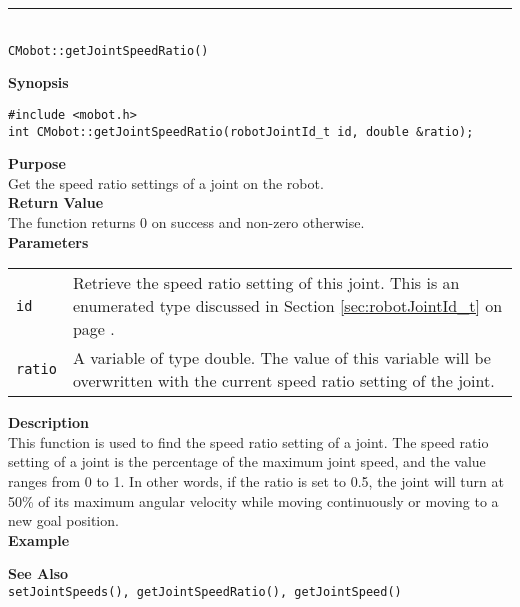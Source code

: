 \noindent
\vspace{5pt}
\rule{4.5in}{0.015in}\\
\noindent
{\LARGE \texttt{CMobot::getJointSpeedRatio()}}\\
{}

\noindent
{\bf Synopsis}\\
\begin{verbatim}
#include <mobot.h>
int CMobot::getJointSpeedRatio(robotJointId_t id, double &ratio);
\end{verbatim}

\noindent
{\bf Purpose}\\
Get the speed ratio settings of a joint on the robot.\\

\noindent
{\bf Return Value}\\
The function returns 0 on success and non-zero otherwise.\\

\noindent
{\bf Parameters}
\vspace{-0.1in}
\begin{description}
\item               
\begin{tabular}{p{10 mm}p{145 mm}}
\texttt{id} & Retrieve the speed ratio setting of this joint. This is an 
enumerated type discussed in Section \ref{sec:robotJointId_t} on page
\pageref{sec:robotJointId_t}.\\
\texttt{ratio} & A variable of type double. The value of this variable will
be overwritten with the current speed ratio setting of the joint.
\end{tabular}
\end{description}

\noindent
{\bf Description}\\
This function is used to find the speed ratio setting of a joint. The speed
ratio setting of a joint is the percentage of the maximum joint speed, and the
value ranges from 0 to 1. In other words, if the ratio is set to 0.5, the joint 
will turn at 50\% of its maximum angular velocity while moving continuously
or moving to a new goal position.\\

\noindent
{\bf Example}\\
\noindent

\noindent
{\bf See Also}\\
\texttt{setJointSpeeds(), getJointSpeedRatio(), getJointSpeed()}

